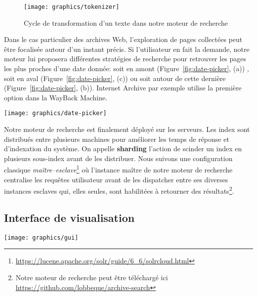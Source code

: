 \documentclass[symmetric,justified,marginals=raggedouter]{tufte-book}
\begin{document}
\begin{figure}%
  \texttt{[image: graphics/tokenizer]}
  \caption{Cycle de transformation d'un texte dans notre moteur de recherche}
  \label{fig:tokenizer}
\end{figure}

\noindent Dans le cas particulier des archives Web, l'exploration de pages collectées peut être focalisée autour d'un instant précis. Si l'utilisateur en fait la demande, notre moteur lui proposera différentes stratégies de recherche pour retrouver les pages les plus proches d'une date donnée: soit en amont (Figure~\ref{fig:date-picker}, (a)) , soit en aval (Figure~\ref{fig:date-picker}, (c)) ou soit autour de cette dernière (Figure~\ref{fig:date-picker}, (b)). Internet Archive par exemple utilise la première option dans la WayBack Machine.

\begin{figure*}%
  \texttt{[image: graphics/date-picker]}
  \caption{Stratégies de choix d'un ensemble de pages par rapport à une date précise}
  \label{fig:date-picker}
\end{figure*}

\noindent Notre moteur de recherche est finalement déployé sur les serveurs. Les index sont distribués entre plusieurs machines pour améliorer les temps de réponse et d'indexation du système. On appelle \textbf{sharding} l'action de scinder un index en plusieurs sous-index avant de les distribuer. Nous suivons une configuration classique \textit{maître--esclave}\footnote{\RaggedOuter \url{https://lucene.apache.org/solr/guide/6_6/solrcloud.html}} où l'instance maître de notre moteur de recherche centralise les requêtes utilisateur avant de les dispatcher entre ses diverses instances esclaves qui, elles seules, sont habilitées à retourner des résultats\footnote{\RaggedOuter Notre moteur de recherche peut être téléchargé ici \url{https://github.com/lobbeque/archive-search}}. 

\subsection{Interface de visualisation}

\begin{figure*}%
  \texttt{[image: graphics/gui]}
  \caption{Capture d'écran de notre interface de visualisation}
  \label{fig:gui}
\end{figure*}
\end{document}
